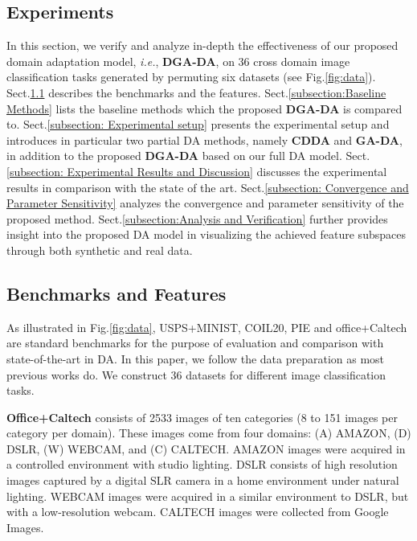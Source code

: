 \documentclass[journal,twocolumn]{IEEEtran}
\begin{document}
\begin{CJK*}{UTF8}{gkai}
							
	\section{Experiments}
In this section, we verify and analyze in-depth the effectiveness of our proposed  domain adaptation model, \textit{i.e.}, \textbf{DGA-DA},  on 36 cross domain image classification tasks generated by permuting six datasets (see Fig.\ref{fig:data}). 
Sect.\ref{subsection:Benchmarks and Features} describes the benchmarks and the features. Sect.\ref{subsection:Baseline Methods} lists the baseline methods which the proposed \textbf{DGA-DA} is compared to. Sect.\ref{subsection: Experimental setup} presents the experimental setup and introduces in particular two partial DA methods, namely \textbf{CDDA} and \textbf{GA-DA}, in addition to the proposed \textbf{DGA-DA} based on our full DA model. Sect.\ref{subsection: Experimental Results and Discussion} discusses the experimental results in comparison with the state of the art. Sect.\ref{subsection: Convergence and Parameter Sensitivity} analyzes the convergence and parameter sensitivity of the proposed method. Sect.\ref{subsection:Analysis and Verification} further provides insight into the proposed DA model in visualizing the achieved feature subspaces through both synthetic and real data.  





	\subsection{Benchmarks and Features}
    \label{subsection:Benchmarks and Features}
As illustrated in Fig.\ref{fig:data}, USPS\cite{DBLP:journals/pami/Hull94}+MINIST\cite{726791}, COIL20\cite{long2013transfer}, PIE\cite{long2013transfer} and office+Caltech\cite{long2013transfer,DBLP:journals/tip/XuFWLZ16,DBLP:journals/tip/HouTYW16,DBLP:journals/ijcv/ShaoKF14} are standard benchmarks for the purpose of evaluation and comparison with state-of-the-art in DA. In this paper, we follow the data preparation as most previous works\cite{DBLP:journals/tcyb/UzairM17,DBLP:journals/tip/XuFWLZ16,DBLP:conf/icml/GongGS13,DBLP:journals/pami/GhifaryBKZ17,DBLP:journals/tip/DingF17,DBLP:journals/corr/LuoWHC17} do. We construct 36 datasets for different image classification tasks.

\textbf{Office+Caltech} consists of 2533 images of ten categories (8 to 151 images per category per domain)\cite{DBLP:journals/pami/GhifaryBKZ17}. These images come from four domains: (A) AMAZON, (D) DSLR, (W) WEBCAM, and (C) CALTECH. AMAZON images were acquired in a controlled environment with studio lighting. DSLR consists of high resolution images captured by a digital SLR camera in a home environment under natural lighting. WEBCAM images were acquired in a similar environment to DSLR, but with a low-resolution webcam. CALTECH images were collected from Google Images. 


\end{CJK*}
\end{document}
